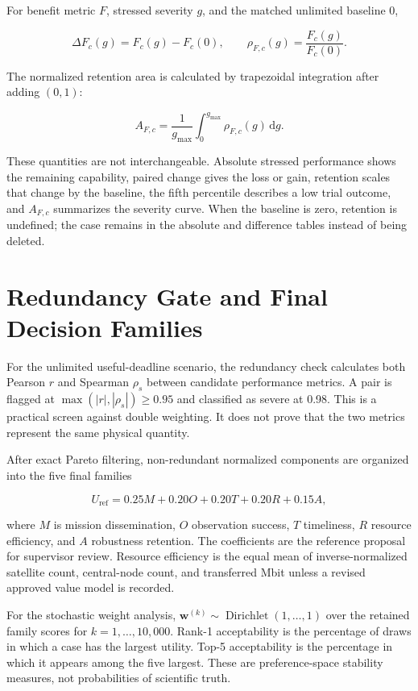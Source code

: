 For benefit metric $F$, stressed severity $g$, and the matched unlimited baseline $0$,

\begin{equation}
\Delta F_c(g)=F_c(g)-F_c(0),\qquad
\rho_{F,c}(g)=\frac{F_c(g)}{F_c(0)}.
\end{equation}

The normalized retention area is calculated by trapezoidal integration after adding $(0,1)$:

\begin{equation}
A_{F,c}=\frac{1}{g_{\max}}\int_0^{g_{\max}}\rho_{F,c}(g)\,\mathrm{d}g.
\end{equation}

These quantities are not interchangeable. Absolute stressed performance shows the remaining capability, paired change gives the loss or gain, retention scales that change by the baseline, the fifth percentile describes a low trial outcome, and $A_{F,c}$ summarizes the severity curve. When the baseline is zero, retention is undefined; the case remains in the absolute and difference tables instead of being deleted.

\section{Redundancy Gate and Final Decision Families}

For the unlimited useful-deadline scenario, the redundancy check calculates both Pearson $r$ and Spearman $\rho_s$ between candidate performance metrics. A pair is flagged at $\max(|r|,|\rho_s|)\ge0.95$ and classified as severe at 0.98. This is a practical screen against double weighting. It does not prove that the two metrics represent the same physical quantity.

After exact Pareto filtering, non-redundant normalized components are organized into the five final families

\begin{equation}
U_{\mathrm{ref}}=0.25M+0.20O+0.20T+0.20R+0.15A,
\end{equation}

where $M$ is mission dissemination, $O$ observation success, $T$ timeliness, $R$ resource efficiency, and $A$ robustness retention. The coefficients are the reference proposal for supervisor review. Resource efficiency is the equal mean of inverse-normalized satellite count, central-node count, and transferred Mbit unless a revised approved value model is recorded.

For the stochastic weight analysis, $\mathbf{w}^{(k)}\sim\operatorname{Dirichlet}(1,\ldots,1)$ over the retained family scores for $k=1,\ldots,10{,}000$. Rank-1 acceptability is the percentage of draws in which a case has the largest utility. Top-5 acceptability is the percentage in which it appears among the five largest. These are preference-space stability measures, not probabilities of scientific truth.
